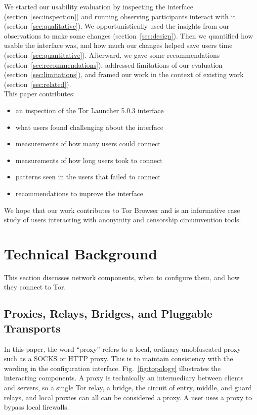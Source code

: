 \documentclass[USenglish,oneside,twocolumn]{article}
\begin{document}
We started our usability evaluation by inspecting the interface (section~\ref{sec:inspection}) and
running observing participants interact with it (section~\ref{sec:qualitative}). 
We opportunistically used the insights from our observations to make some changes (section~\ref{sec:design}).
Then we quantified how usable the interface was, and 
how much our changes helped save users time (section~\ref{sec:quantitative}).
Afterward, we gave some recommendations (section~\ref{sec:recommendations}), addressed
limitations of our evaluation (section~\ref{sec:limitations}), and framed our work in the context of existing work (section~\ref{sec:related}). \\

\noindent This paper contributes:
\smallskip
\begin{itemize}
\item an inspection of the Tor Launcher 5.0.3 interface
\item what users found challenging about the interface
\item measurements of how many users could connect
\item measurements of how long users took to connect
\item patterns seen in the users that failed to connect
\item recommendations to improve the interface
\end{itemize}

We hope that our work contributes to Tor Browser and is an informative case study of users interacting with anonymity and censorship circumvention tools. 

\section{Technical Background}
\label{sec:background}
This section discusses network components, when to configure them, and how they connect to Tor. 

\subsection{Proxies, Relays, Bridges, and Pluggable Transports} 

In this paper, the word ``proxy'' refers to a local, ordinary unobfuscated proxy such as a SOCKS or HTTP proxy. This is to maintain consistency with the wording in the configuration interface. Fig.~\ref{fig:topology} illustrates the interacting components. A proxy is technically an intermediary between clients and servers, so a single Tor relay, a bridge, the circuit of entry, middle, and guard relays, and local proxies can all can be considered a proxy. A user uses a proxy to bypass local firewalls. 
\end{document}
